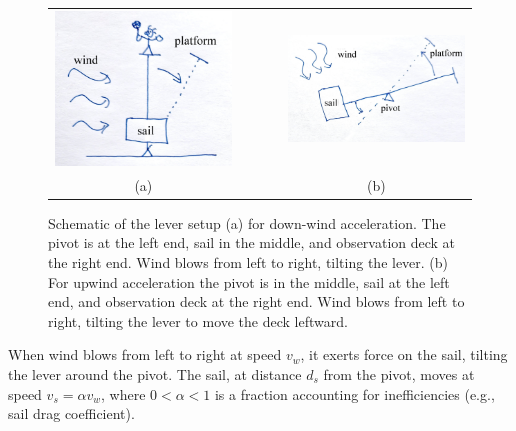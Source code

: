 \documentclass[reprint,aps,pra,superscriptaddress,longbibliography]{revtex4-2}
\begin{document}
\begin{figure}[htbp]
\centering
\begin{tabular}{ccc}
\includegraphics[width=0.8\columnwidth]{2025-wind-lww.jpg}
&$\qquad$&
\includegraphics[width=0.8\columnwidth]{2025-wind-law.jpg}
\\
(a)&&(b)
\end{tabular}
\caption{Schematic of the lever setup (a) for down-wind acceleration. The pivot is at the left end, sail in the middle, and observation deck at the right end. Wind blows from left to right, tilting the lever.
(b) For upwind acceleration the pivot is in the middle, sail at the left end, and observation deck at the right end. Wind blows from left to right, tilting the lever to move the deck leftward.}
\label{fig:lever-downupwind}
\end{figure}

When wind blows from left to right at speed $v_w$, it exerts force on the sail, tilting the lever around the pivot. The sail, at distance $d_s$ from the pivot, moves at speed $v_s = \alpha v_w$, where $0< \alpha < 1$ is a fraction accounting for inefficiencies (e.g., sail drag coefficient).
\end{document}
